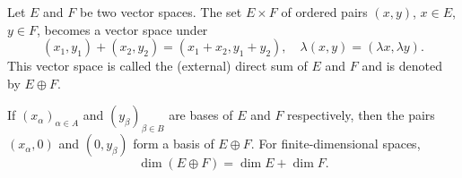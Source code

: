 Let $E$ and $F$ be two vector spaces. The set $E \times F$ of ordered pairs $(x, y)$, $x \in E$, $y \in F$, becomes a vector space under
$$(x_1, y_1) + (x_2, y_2) = (x_1 + x_2, y_1 + y_2), \quad \lambda(x, y) = (\lambda x, \lambda y).$$
This vector space is called the (external) direct sum of $E$ and $F$ and is denoted by $E \oplus F$.

If $(x_\alpha)_{\alpha \in A}$ and $(y_\beta)_{\beta \in B}$ are bases of $E$ and $F$ respectively, then the pairs $(x_\alpha, 0)$ and $(0, y_\beta)$ form a basis of $E \oplus F$. For finite-dimensional spaces,
$$\dim(E \oplus F) = \dim E + \dim F.$$

